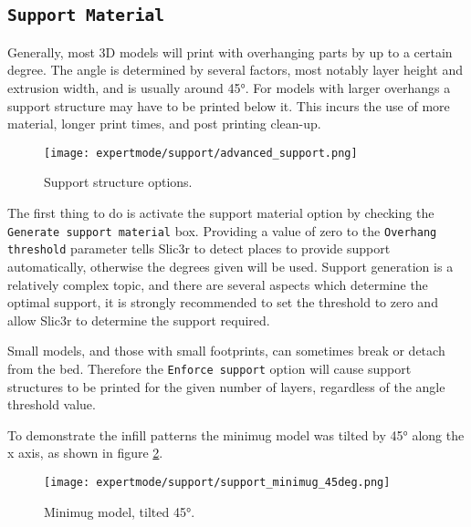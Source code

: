 \subsection{\texttt{Support Material}} %
\label{sec:support}

Generally, most 3D models will print with overhanging parts by up to a certain degree.  The angle is determined by several factors, most notably layer height and extrusion width, and is usually around 45°.  For models with larger overhangs a support structure may have to be printed below it.  This incurs the use of more material, longer print times, and post printing clean-up.

\begin{figure}[H]
\centering
\texttt{[image: expertmode/support/advanced\_support.png]}
\caption{Support structure options.}
\label{fig:advanced_support}
\end{figure}

The first thing to do is activate the support material option by checking the \texttt{Generate support material} box.  Providing a value of zero to the \texttt{Overhang threshold} parameter tells Slic3r to detect places to provide support automatically, otherwise the degrees given will be used.  Support generation is a relatively complex topic, and there are several aspects which determine the optimal support, it is strongly recommended to set the threshold to zero and allow Slic3r to determine the support required.

Small models, and those with small footprints, can sometimes break or detach from the bed.  Therefore the \texttt{Enforce support} option will cause support structures to be printed for the given number of layers, regardless of the angle threshold value.

To demonstrate the infill patterns the minimug model was tilted by 45° along the x axis, as shown in figure \ref{fig:support_minimug_45deg}.

\begin{figure}[H]
\centering
\texttt{[image: expertmode/support/support\_minimug\_45deg.png]}
\caption{Minimug model, tilted 45°.}
\label{fig:support_minimug_45deg}
\end{figure}

